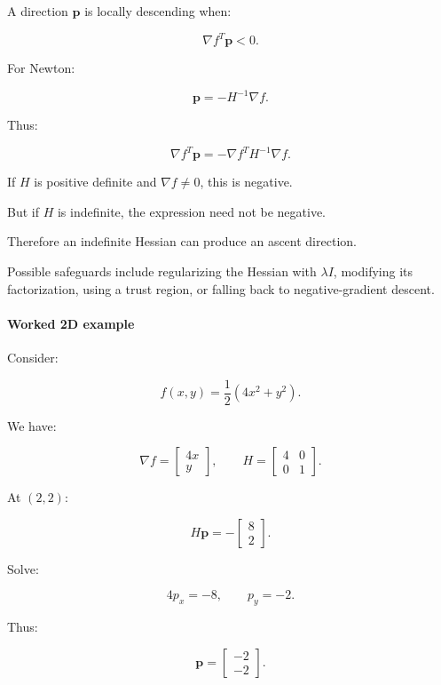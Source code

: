 \hypertarget{02-foundations-ii-ch026-the-newton-direction-is-not-always-a-descent-direction}{}

A direction \(\mathbf p\) is locally descending when:

\[
\nabla f^T\mathbf p<0.
\]

For Newton:

\[
\mathbf p=-H^{-1}\nabla f.
\]

Thus:

\[
\nabla f^T\mathbf p = -\nabla f^TH^{-1}\nabla f.
\]

If \(H\) is positive definite and \(\nabla f\ne0\), this is negative.

But if \(H\) is indefinite, the expression need not be negative.

Therefore an indefinite Hessian can produce an ascent direction.

Possible safeguards include regularizing the Hessian with \(\lambda I\), modifying its factorization, using a trust region, or falling back to negative-gradient descent.

\paragraph{Worked 2D example}\label{02-foundations-ii-ch026-worked-2d-example}

\hypertarget{02-foundations-ii-ch026-worked-2d-example}{}

Consider:

\[
f(x,y)=\frac12(4x^2+y^2).
\]

We have:

\[
\nabla f= \begin{bmatrix} 4x\\y \end{bmatrix}, \qquad H= \begin{bmatrix} 4&0\\0&1 \end{bmatrix}.
\]

At \((2,2)\):

\[
H\mathbf p= - \begin{bmatrix}8\\2\end{bmatrix}.
\]

Solve:

\[
4p_x=-8,\qquad p_y=-2.
\]

Thus:

\[
\mathbf p= \begin{bmatrix}-2\\-2\end{bmatrix}.
\]

